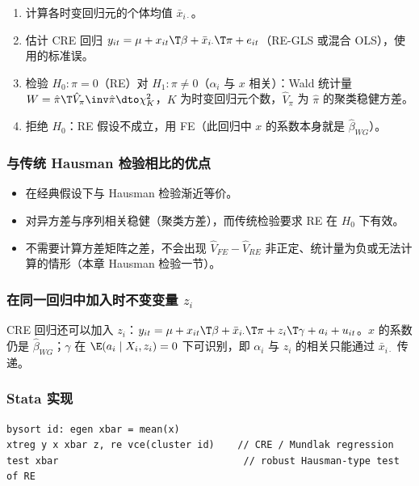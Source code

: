 \begin{method}
\begin{enumerate}
  \item 计算各时变回归元的个体均值 $\bar x_{i\cdot}$。
  \item 估计 CRE 回归 $y_{it}=\mu+x_{it}\T\beta+\bar x_{i\cdot}\T\pi+e_{it}$（RE-GLS 或混合 OLS），使用的标准误。
  \item 检验 $H_0:\pi=0$（RE）对 $H_1:\pi\neq0$（$\alpha_i$ 与 $x$ 相关）：Wald 统计量 $W=\hat\pi\T\hat V_{\pi}\inv\hat\pi\dto\chi^2_K$，$K$ 为时变回归元个数，$\hat V_\pi$ 为 $\hat\pi$ 的聚类稳健方差。
  \item 拒绝 $H_0$：RE 假设不成立，用 FE（此回归中 $x$ 的系数本身就是 $\hat\beta_{WG}$）。
\end{enumerate}
\end{method}

\subsubsection{与传统 Hausman 检验相比的优点}

\begin{itemize}
  \item 在经典假设下与 Hausman 检验渐近等价。
  \item 对异方差与序列相关稳健（聚类方差），而传统检验要求 RE 在 $H_0$ 下有效。
  \item 不需要计算方差矩阵之差，不会出现 $\hat V_{FE}-\hat V_{RE}$ 非正定、统计量为负或无法计算的情形（本章 Hausman 检验一节）。
\end{itemize}

\subsubsection{在同一回归中加入时不变变量 \texorpdfstring{$z_i$}{z\_i}}

CRE 回归还可以加入 $z_i$：$y_{it}=\mu+x_{it}\T\beta+\bar x_{i\cdot}\T\pi+z_i\T\gamma+a_i+u_{it}$。$x$ 的系数仍是 $\hat\beta_{WG}$；$\gamma$ 在 $\E(a_i\mid X_i,z_i)=0$ 下可识别，即 $\alpha_i$ 与 $z_i$ 的相关只能通过 $\bar x_{i\cdot}$ 传递。

\subsubsection{Stata 实现}

\begin{lstlisting}
bysort id: egen xbar = mean(x)
xtreg y x xbar z, re vce(cluster id)    // CRE / Mundlak regression
test xbar                                // robust Hausman-type test of RE
\end{lstlisting}

